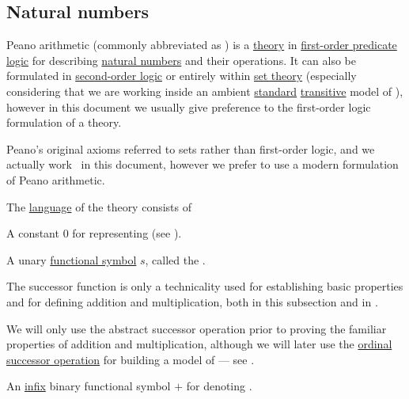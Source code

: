 \subsection{Natural numbers}\label{subsec:natural_numbers}

\begin{definition}\label{def:peano_arithmetic}
  Peano arithmetic (commonly abbreviated as ) is a \hyperref[def:first_order_theory]{theory} in \hyperref[subsec:first_order_logic]{first-order predicate logic} for describing \hyperref[def:set_of_natural_numbers]{natural numbers} and their operations. It can also be formulated in \hyperref[rem:higher_order_logic]{second-order logic} or entirely within \hyperref[sec:set_theory]{set theory} (especially considering that we are working inside an ambient \hyperref[rem:standard_model_of_set_theory]{standard} \hyperref[rem:transitive_model_of_set_theory]{transitive} model of \hyperref[def:axiom_of_universes]{}), however in this document we usually give preference to the first-order logic formulation of a theory.

  Peano's original axioms referred to sets rather than first-order logic, and we actually work  \ in this document, however we prefer to use a modern formulation of Peano arithmetic.

  The \hyperref[def:first_order_language]{language} of the theory consists of
  \begin{thmenum}[series=def:peano_arithmetic]
     A constant \( 0 \) for representing  (see ).

     A unary \hyperref[def:first_order_language/func]{functional symbol} \( s \), called the .

    The successor function is only a technicality used for establishing basic properties and for defining addition and multiplication, both in this subsection and in .

    We will only use the abstract successor operation prior to proving the familiar properties of addition and multiplication, although we will later use the \hyperref[def:ordinal_successor]{ordinal successor operation} for building a model of  --- see .

     An \hyperref[rem:first_order_formula_conventions/infix]{infix} binary functional symbol \( + \) for denoting .


\end{thmenum}
\end{definition}
